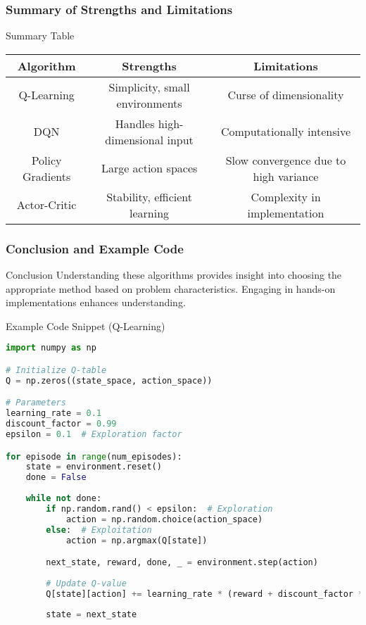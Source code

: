 \documentclass[aspectratio=169]{beamer}
\begin{document}
\begin{frame}[fragile]
    \frametitle{Summary of Strengths and Limitations}
    \begin{block}{Summary Table}
    \begin{center}
        \begin{tabular}{|c|c|c|}
            \hline
            \textbf{Algorithm} & \textbf{Strengths} & \textbf{Limitations} \\
            \hline
            Q-Learning & Simplicity, small environments & Curse of dimensionality \\
            DQN & Handles high-dimensional input & Computationally intensive \\
            Policy Gradients & Large action spaces & Slow convergence due to high variance \\
            Actor-Critic & Stability, efficient learning & Complexity in implementation \\
            \hline
        \end{tabular}
    \end{center}
    \end{block}
\end{frame}

\begin{frame}[fragile]
    \frametitle{Conclusion and Example Code}
    \begin{block}{Conclusion}
        Understanding these algorithms provides insight into choosing the appropriate method based on problem characteristics. Engaging in hands-on implementations enhances understanding.
    \end{block}
    
    \begin{block}{Example Code Snippet (Q-Learning)}
    \begin{lstlisting}[language=Python]
import numpy as np

# Initialize Q-table
Q = np.zeros((state_space, action_space))

# Parameters
learning_rate = 0.1
discount_factor = 0.99
epsilon = 0.1  # Exploration factor

for episode in range(num_episodes):
    state = environment.reset()
    done = False
    
    while not done:
        if np.random.rand() < epsilon:  # Exploration
            action = np.random.choice(action_space)
        else:  # Exploitation
            action = np.argmax(Q[state])

        next_state, reward, done, _ = environment.step(action)
        
        # Update Q-value
        Q[state][action] += learning_rate * (reward + discount_factor * np.max(Q[next_state]) - Q[state][action])
        
        state = next_state
    \end{lstlisting}
    \end{block}
\end{frame}
\end{document}
